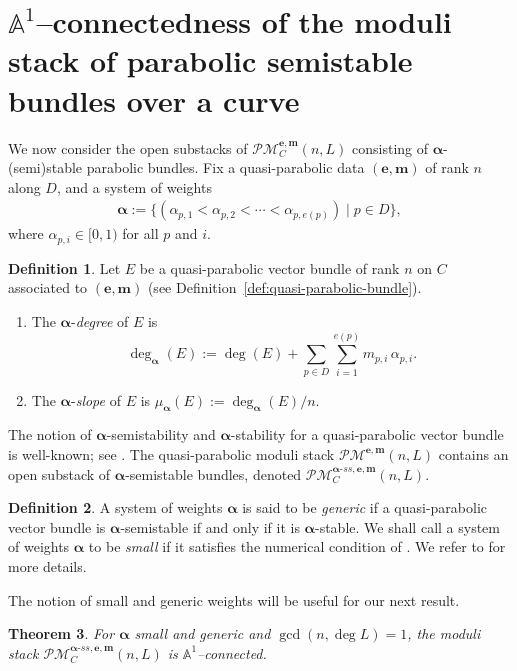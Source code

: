 \documentclass[12pt,reqno]{amsart}
\newcommand{\mc}[1]{\mathcal{#1}}
\newcommand{\bb}[1]{\mathbb{#1}}
\newtheorem{theorem}{Theorem}[section]
\theoremstyle{definition}
\newtheorem{definition}[theorem]{Definition}
\numberwithin{equation}{section}
\begin{document}
	\section{$\bb{A}^1$--connectedness of the moduli stack of parabolic
		semistable bundles over a curve}
	\label{section:parabolic}
	
	We now consider the open substacks of $\mc{PM}_C^{\boldsymbol{e,m}}(n,L)$
	consisting of $\boldsymbol{\alpha}$-(semi)stable parabolic bundles. Fix a
	quasi-parabolic data $(\boldsymbol{e,m})$ of rank $n$ along $D$, and a
	system of weights
	\begin{align}\label{eqn:weights}
		\boldsymbol{\alpha} :=\{(\alpha_{p,1}<\alpha_{p,2}<\cdots
		<\alpha_{p,e(p)})\mid p\in D\},
	\end{align}
	where $\alpha_{p,i}\in [0,1)$ for all $p$ and $i$.
	
	\begin{definition}\label{def:parabolic-bundles}
		Let $E$ be a quasi-parabolic vector bundle of rank $n$ on $C$ associated to
		$(\boldsymbol{e,m})$ (see Definition~\ref{def:quasi-parabolic-bundle}).
		\begin{enumerate}[(1)]
			\item The $\boldsymbol{\alpha}$-\textit{degree} of $E$ is
			\[
			\deg_{\boldsymbol{\alpha}}(E) := \deg(E)
			+\sum_{p\in D}\sum_{i=1}^{e(p)}m_{p,i}\,\alpha_{p,i}.
			\]
			\item The $\boldsymbol{\alpha}$-\textit{slope} of $E$ is
			$\mu_{\boldsymbol{\alpha}}(E):=\deg_{\boldsymbol{\alpha}}(E)/n$.
		\end{enumerate}
	\end{definition}
	
	The notion of $\boldsymbol{\alpha}$-semistability and
	$\boldsymbol{\alpha}$-stability for a quasi-parabolic vector bundle is
	well-known; see \cite[Definition~1.13]{MS80}. The quasi-parabolic moduli
	stack $\mc{PM}^{\boldsymbol{e,m}}(n,L)$ contains an open substack of
	$\boldsymbol{\alpha}$-semistable bundles, denoted
	$\mc{PM}^{\boldsymbol{\alpha}\text{-}ss,\boldsymbol{e,m}}_C(n,L)$.
	
	\begin{definition}
		A system of weights $\boldsymbol{\alpha}$ is said to be \textit{generic} if a quasi-parabolic vector bundle is $\boldsymbol{\alpha}$-semistable if and only if it is $\boldsymbol{\alpha}$-stable. We shall call a system of weights $\boldsymbol{\alpha}$ to be \textit{small} if it satisfies the numerical condition of \cite[Proposition 5.3]{BY99}. We refer to \cite[\S~2 and \S~5]{BY99} for more details.
	\end{definition}
	 The notion of small and generic weights will be useful for our next result.
	\begin{theorem}\label{thm:parabolic-semistable-moduli-a1-connected}
		For $\boldsymbol{\alpha}$ small and generic and $\gcd(n,\deg L) = 1$, the
		moduli stack $\mc{PM}^{\boldsymbol{\alpha}\text{-}ss,\boldsymbol{e,m}}_C(n,L)$
		is $\bb{A}^1$--connected.
	\end{theorem}
	
\end{document}

